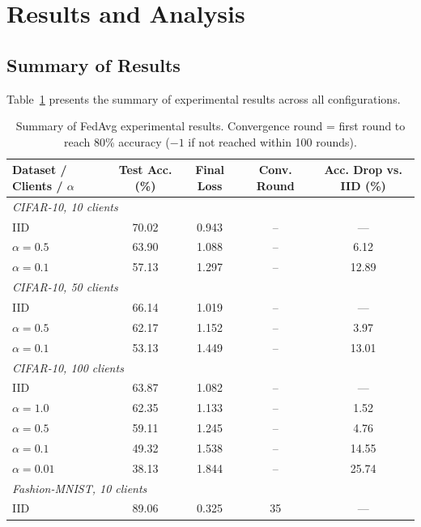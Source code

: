 \documentclass[journal]{IEEEtran}
\begin{document}
\section{Results and Analysis}
\label{sec:results}

\subsection{Summary of Results}

Table~\ref{tab:results} presents the summary of experimental results across all configurations.

\begin{table}[t]
\centering
\caption{Summary of FedAvg experimental results. Convergence round = first round to reach 80\% accuracy ($-1$ if not reached within 100 rounds).}
\label{tab:results}
\begin{tabular}{lcccc}
\toprule
\textbf{Dataset / Clients / $\alpha$} & \textbf{Test Acc. (\%)} & \textbf{Final Loss} & \textbf{Conv. Round} & \textbf{Acc. Drop vs. IID (\%)} \\
\midrule
\multicolumn{5}{l}{\textit{CIFAR-10, 10 clients}} \\
\quad IID     & 70.02 & 0.943 & --  & --- \\
\quad $\alpha=0.5$  & 63.90 & 1.088 & --  & 6.12 \\
\quad $\alpha=0.1$  & 57.13 & 1.297 & --  & 12.89 \\
\midrule
\multicolumn{5}{l}{\textit{CIFAR-10, 50 clients}} \\
\quad IID     & 66.14 & 1.019 & --  & --- \\
\quad $\alpha=0.5$  & 62.17 & 1.152 & --  & 3.97 \\
\quad $\alpha=0.1$  & 53.13 & 1.449 & --  & 13.01 \\
\midrule
\multicolumn{5}{l}{\textit{CIFAR-10, 100 clients}} \\
\quad IID     & 63.87 & 1.082 & --  & --- \\
\quad $\alpha=1.0$  & 62.35 & 1.133 & --  & 1.52 \\
\quad $\alpha=0.5$  & 59.11 & 1.245 & --  & 4.76 \\
\quad $\alpha=0.1$  & 49.32 & 1.538 & --  & 14.55 \\
\quad $\alpha=0.01$ & 38.13 & 1.844 & --  & 25.74 \\
\midrule
\multicolumn{5}{l}{\textit{Fashion-MNIST, 10 clients}} \\
\quad IID     & 89.06 & 0.325 & 35  & --- \\

\end{tabular}
\end{table}
\end{document}
